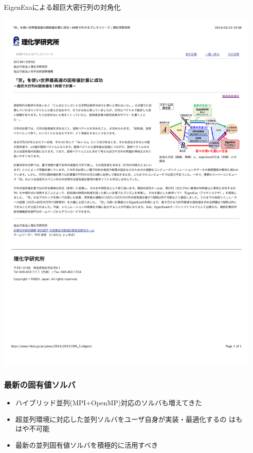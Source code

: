 \begin{frame}{EigenExaによる超巨大密行列の対角化}
  \begin{center}
    \includegraphics[height=0.8\textheight]{figure/eigenexa.pdf}
  \end{center}
\end{frame}

\begin{frame}
  \frametitle{最新の固有値ソルバ}
  \begin{itemize}
    \setlength{\itemsep}{1em}
  \item ハイブリッド並列(MPI+OpenMP)対応のソルバも増えてきた
  \item 超並列環境に対応した並列ソルバをユーザ自身が実装・最適化するの
    はもはや不可能
  \item 最新の並列固有値ソルバを積極的に活用すべき
  \end{itemize}
\end{frame}

